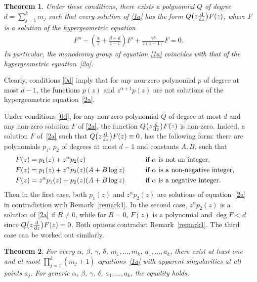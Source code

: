 \documentclass[pdftex]{sigma}
\numberwithin{equation}{section}
\newtheorem{thm}{Theorem}[section]
\def\lc{,\allowbreak\ldots,\allowbreak}
\begin{document}
\begin{thm}\label{theorem1}
Under these conditions, there exists a polynomial $Q$ of degree $d=\sum\limits_{j=1}^km_j$ such that every solution of \eqref{1a} has the form $Q\big(z\frac{{\rm d}}{{\rm d}z}\big)F(z) $, where $F$ is a solution of the hypergeometric equation
\begin{gather}\label{2a}
F''-\left( \frac\alpha z+\frac{\beta+d}{z-1} \right) F'+\frac{\gamma\delta}{z(z-1)} F = 0.
\end{gather}
In particular, the monodromy group of equation \eqref{1a} coincides with that of the hypergeometric equation~\eqref{2a}.
\end{thm}

\begin{Remark}\label{remark1} Clearly, conditions \eqref{0d} imply that for any non-zero polynomial $p$ of degree at most $d-1$, the functions $p(z)$ and $z^{\alpha+1}p(z)$ are not solutions of the hypergeometric equation~\eqref{2a}.
\end{Remark}

\begin{Remark}\label{remark2} Under conditions \eqref{0d}, for any non-zero polynomial $Q$ of degree at most $d$ and any non-zero solution $F$ of \eqref{2a}, the function $Q\big(z\frac{{\rm d}}{{\rm d}z}\big)F(z)$ is non-zero. Indeed, a solution $F$ of~\eqref{2a} such that $Q\big(z\frac{{\rm d}}{{\rm d}z}\big)F(z)\equiv 0$, has the following form: there are polynomials $p_1$, $p_2$ of degrees at most $d-1$ and constants $A,B$, such that
\begin{alignat*}{3}
& F(z) = p_1(z) + z^\alpha p_2(z)\qquad && \hbox{\rm if $\alpha$ is not an integer},&\\
& F(z) = p_1(z) + z^\alpha p_2(z) (A+B\log z)\qquad && \hbox{\rm if $\alpha$ is a non-negative integer},&\\
& F(z) = z^\alpha p_1(z) + p_2(z) (A+B\log z)\qquad && \hbox{\rm if $\alpha$ is a negative integer}. &
\end{alignat*}
Then in the first case, both $p_1(z)$ and $z^\alpha p_2(z)$ are solutions of equation~\eqref{2a} in contradiction with Remark~\ref{remark1}. In the second case, $z^\alpha p_2(z)$ is a solution of \eqref{2a} if $B\ne 0$, while for $B=0$, $F(z)$ is a polynomial and $ \deg F<d$ since $Q\big(z\frac{{\rm d}}{{\rm d}z}\big)F(z)=0$. Both options contradict Remark~\ref{remark1}. The third case can be worked out similarly.
\end{Remark}

\begin{thm}\label{theorem2}
For every $\alpha$, $\beta$, $\gamma$, $\delta$, $m_1\lc m_k$, $a_1\lc a_k$, there exist at least one and at most $\prod\limits_{j=1}^k(m_j+1)$ equations~\eqref{1a} with apparent singularities at all points $a_j$. For generic $\alpha$, $\beta$, $\gamma$, $\delta$, $a_1\lc a_k$, the equality holds.
\end{thm}
\end{document}
